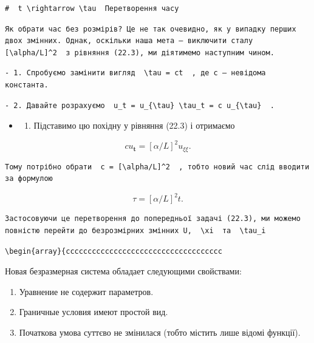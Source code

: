 \documentclass[
  ukrainian,
]{article}
\providecommand{\tightlist}{%
  \setlength{\itemsep}{0pt}\setlength{\parskip}{0pt}}
\begin{document}
\begin{verbatim}
#  t \rightarrow \tau  Перетворення часу
\end{verbatim}

\begin{verbatim}
Як обрати час без розмірів? Це не так очевидно, як у випадку перших двох змінних. Однак, оскільки наша мета — виключити сталу  [\alpha/L]^2  з рівняння (22.3), ми діятимемо наступним чином.
\end{verbatim}

\begin{verbatim}
- 1. Спробуємо замінити вигляд  \tau = ct  , де c — невідома константа.
\end{verbatim}

\begin{verbatim}
- 2. Давайте розрахуємо  u_t = u_{\tau} \tau_t = c u_{\tau}  .
\end{verbatim}

\begin{itemize}
\tightlist
\item
  \begin{enumerate}
  \def\labelenumi{\arabic{enumi}.}
  \setcounter{enumi}{2}
  \tightlist
  \item
    Підставимо цю похідну у рівняння (22.3) і отримаємо
  \end{enumerate}
\end{itemize}

\[
cu_{\mathbf{t}} = [\alpha/L]^2 u_{\xi\xi}.
\]

\begin{verbatim}
Тому потрібно обрати  c = [\alpha/L]^2  , тобто новий час слід вводити за формулою
\end{verbatim}

\[
\tau = [\alpha/L]^2 t.
\]

\begin{verbatim}
Застосовуючи це перетворення до попередньої задачі (22.3), ми можемо повністю перейти до безрозмірних змінних U,  \xi  та  \tau_i
\end{verbatim}

\begin{verbatim}
\begin{array}{cccccccccccccccccccccccccccccccccccc
\end{verbatim}

Новая безразмерная система обладает следующими свойствами:

\begin{enumerate}
\def\labelenumi{\arabic{enumi}.}
\item
  Уравнение не содержит параметров.
\item
  Граничные условия имеют простой вид.
\item
  Початкова умова суттєво не змінилася (тобто містить лише відомі
  функції).
\end{enumerate}
\end{document}
